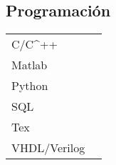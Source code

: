 \documentclass[a4paper,10pt]{article}
\begin{document}
\begin{adjustbox}{valign=t}
\begin{minipage}{0.60\textwidth}
\begin{multicols}{2}
\section*{Programación}
\begin{tabular}{ll}
	C/C^{++}        & 
	\\

	Matlab 	    	& 
	\\

		Python    	&
		\\
	SQL    	& 
	\\
		Tex 	    & 
	\\
	VHDL/Verilog 	& 
\end{tabular}
\end{multicols}
\end{minipage}
\end{adjustbox}
\end{document}
